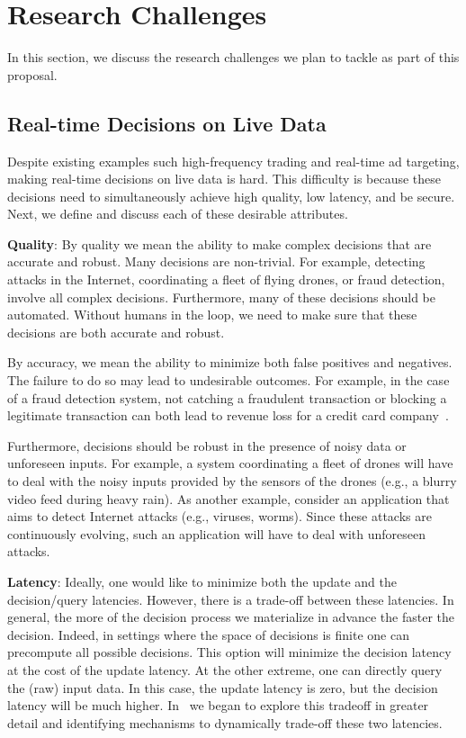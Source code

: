 \section{Research Challenges }

In this section, we discuss the research challenges we plan to tackle as part of this proposal.


\subsection{Real-time Decisions on Live Data} 

Despite existing examples such high-frequency trading and real-time ad targeting, making real-time decisions on live data is hard. This difficulty is because these decisions need to simultaneously achieve high quality, low latency, and be secure. Next, we define and discuss each of these desirable attributes.

{\bf Quality}: By quality we mean the ability to make complex decisions that are accurate and robust. Many decisions are non-trivial. For example, detecting attacks in the Internet, coordinating a fleet of flying drones, or fraud detection, involve all complex decisions. Furthermore, many of these decisions should be automated. Without humans in the loop, we need to make sure that these decisions are both accurate and robust. 

By accuracy, we mean the ability to minimize both false positives and negatives. The failure to do so may lead to undesirable outcomes. For example, in the case of a fraud detection system, not catching a fraudulent transaction or blocking a legitimate transaction can both lead to revenue loss for a credit card company~\cite{Sculley11}. 

Furthermore, decisions should be robust in the presence of noisy data or unforeseen inputs. For example, a system coordinating a fleet of drones will have to deal with the noisy inputs provided by the sensors of the drones (e.g., a blurry video feed during heavy rain). As another example, consider an application that aims to detect Internet attacks (e.g., viruses, worms). Since these attacks are continuously evolving, such an application will have to deal with unforeseen attacks.

{\bf Latency}:  Ideally, one would like to minimize both the update and the decision/query latencies. However, there is a trade-off between these latencies.  In general, the more of the decision process we materialize in advance the faster the decision. Indeed, in settings where the space of decisions is finite one can precompute all possible decisions. This option will minimize the decision latency at the cost of the update latency.  At the other extreme, one can directly query the (raw) input data. In this case, the update latency is zero, but the decision latency will be much higher.  In~\cite{Crankshaw15} we began to explore this tradeoff in greater detail and identifying mechanisms to dynamically trade-off these two latencies.

